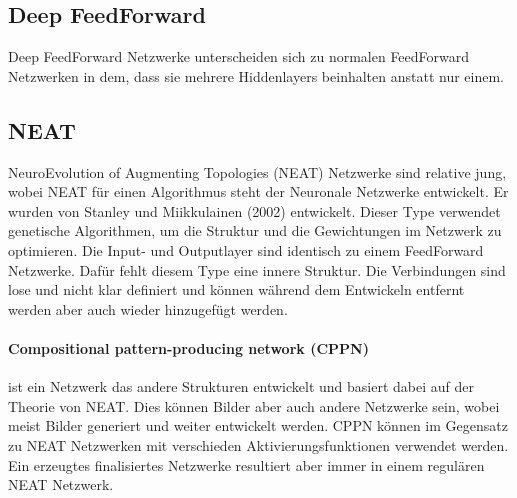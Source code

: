 
\subsection{Deep FeedForward}
\label{subsec:DeepFeedForward}

Deep FeedForward Netzwerke unterscheiden sich zu normalen FeedForward Netzwerken in dem, dass sie mehrere Hiddenlayers beinhalten anstatt nur einem.

\subsection{NEAT}

NeuroEvolution of Augmenting Topologies (NEAT) Netzwerke sind relative jung, wobei NEAT für einen Algorithmus steht der Neuronale Netzwerke entwickelt.
Er wurden von Stanley und Miikkulainen (2002) entwickelt. 
Dieser Type verwendet genetische Algorithmen, um die Struktur und die Gewichtungen im Netzwerk zu optimieren.
Die Input- und Outputlayer sind identisch zu einem FeedForward Netzwerke.
Dafür fehlt diesem Type eine innere Struktur. 
Die Verbindungen sind lose und nicht klar definiert und können während dem Entwickeln entfernt werden aber auch wieder hinzugefügt werden.


\paragraph{Compositional pattern-producing network (CPPN)} ist ein Netzwerk das andere Strukturen entwickelt und basiert dabei auf der Theorie von NEAT. 
Dies können Bilder aber auch andere Netzwerke sein, wobei meist Bilder generiert und weiter entwickelt werden.
CPPN können im Gegensatz zu NEAT Netzwerken mit verschieden Aktivierungsfunktionen verwendet werden.
Ein erzeugtes finalisiertes Netzwerke resultiert aber immer in einem regulären NEAT Netzwerk.


